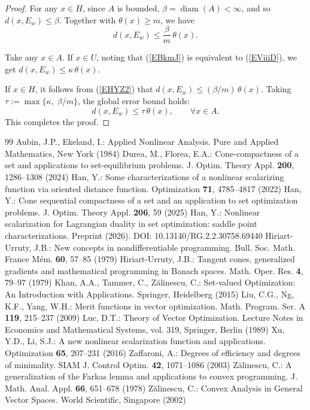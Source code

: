 \documentclass[10pt,a4paper]{amsart}
\begin{document}
\begin{proof}
	For any $x\in H$, since $A$ is bounded, $\beta =\operatorname{diam}(A)<\infty$, and so $d(x,E_w)\le \beta$. Together with $\theta(x)\ge m$, we have 
	\begin{equation} \label{EHYZ2}
		d(x,E_w)\le \frac{\beta}{m}\,\theta(x).  
	\end{equation}
	
	Take any $x\in A$.  If $x\in U$, noting that  (\ref{EBkmJ})  is  equivalent to (\ref{EViiiD}), we get  
	   $d(x,E_w)\le\kappa\,\theta(x)$.
  
 If $x\in H$,  it follows from  (\ref{EHYZ2}) that $d(x,E_w)\le (\beta/m)\,\theta(x)$.
 	Taking $\tau:=\max\{\kappa,\; \beta/m\}$, the global error bound holds:
	\[
	d(x,E_w)\le\tau\,\theta(x),\qquad \forall x\in A.
	\]
	This completes the proof. 
	\end{proof}


\begin{thebibliography}{99}
 Aubin, J.P., Ekeland, I.: Applied Nonlinear Analysis. Pure and Applied Mathematics, New York (1984)
 Durea, M., Florea, E.A.: Cone-compactness of a set and applications to set-equilibrium problems. J. Optim. Theory Appl. \textbf{200}, 1286–1308 (2024)
 Han, Y.: Some characterizations of a nonlinear scalarizing function via oriented distance function. Optimization \textbf{71}, 4785–4817 (2022)
 Han, Y.: Cone sequential compactness of a set and an application to set optimization problems. J. Optim. Theory Appl. \textbf{206}, 59 (2025)
 Han, Y.: Nonlinear scalarization for Lagrangian duality in set optimization: saddle point characterizations. Preprint (2026). DOI: 10.13140/RG.2.2.30758.69440
 Hiriart-Urruty, J.B.: New concepts in nondifferentiable programming. Bull. Soc. Math. France Mém. \textbf{60}, 57–85 (1979)
 Hiriart-Urruty, J.B.: Tangent cones, generalized gradients and mathematical programming in Banach spaces. Math. Oper. Res. \textbf{4}, 79–97 (1979)
 Khan, A.A., Tammer, C., Zălinescu, C.: Set-valued Optimization: An Introduction with Applications. Springer, Heidelberg (2015)
 Liu, C.G., Ng, K.F., Yang, W.H.: Merit functions in vector optimization. Math. Program. Ser. A \textbf{119}, 215–237 (2009)
 Luc, D.T.: Theory of Vector Optimization. Lecture Notes in Economics and Mathematical Systems, vol. 319, Springer, Berlin (1989)
 Xu, Y.D., Li, S.J.: A new nonlinear scalarization function and applications. Optimization \textbf{65}, 207–231 (2016)
 Zaffaroni, A.: Degrees of efficiency and degrees of minimality. SIAM J. Control Optim. \textbf{42}, 1071–1086 (2003)
 Zălinescu, C.: A generalization of the Farkas lemma and applications to convex programming. J. Math. Anal. Appl. \textbf{66}, 651–678 (1978)
 Zălinescu, C.: Convex Analysis in General Vector Spaces. World Scientific, Singapore (2002)
\end{thebibliography}
\end{document}
